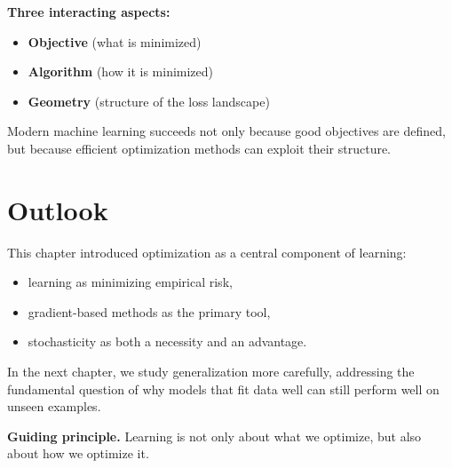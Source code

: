 \medskip

\noindent
\textbf{Three interacting aspects:}
\begin{itemize}
    \item \textbf{Objective} (what is minimized)
    \item \textbf{Algorithm} (how it is minimized)
    \item \textbf{Geometry} (structure of the loss landscape)
\end{itemize}

\medskip

Modern machine learning succeeds not only because good objectives are defined, but because efficient optimization methods can exploit their structure.

\section{Outlook}

This chapter introduced optimization as a central component of learning:
\begin{itemize}
    \item learning as minimizing empirical risk,
    \item gradient-based methods as the primary tool,
    \item stochasticity as both a necessity and an advantage.
\end{itemize}

\medskip

In the next chapter, we study generalization more carefully, addressing the fundamental question of why models that fit data well can still perform well on unseen examples.

\medskip

\noindent
\textbf{Guiding principle.}  
Learning is not only about what we optimize, but also about how we optimize it.
